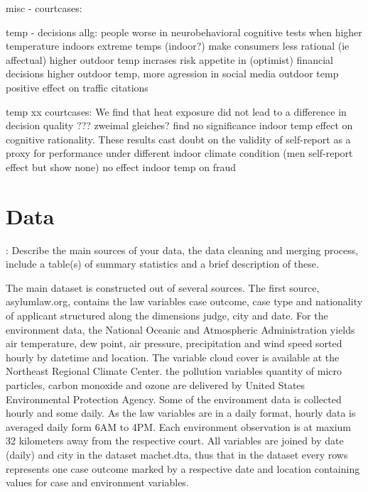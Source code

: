 \documentclass[11pt]{article}
\begin{document}
	misc - courtcases:
	
	temp - decisions allg: 
	\cite{Chen.2020} people worse in neurobehavioral cognitive tests when higher temperature indoors
	\cite{Hadi.2019} extreme temps (indoor?) make consumers less rational (ie affectual) 
	\cite{Gavresi.2021} higher outdoor temp incrases risk appetite in (optimist) financial decisions 
	\cite{Stevens.2021} higher outdoor temp, more agression in social media 
	\cite{Ryan.2020} outdoor temp positive effect on traffic citations
	
	temp xx courtcases:
	\cite{Stroom.2021} We find that heat exposure did not lead to  a difference in decision quality ??? zweimal gleiches?
	\cite{Stroom.2021} find no significance indoor temp effect on cognitive rationality.  These results cast doubt on the validity of self-report as a proxy for performance under different indoor climate condition (men self-report effect but show none) 
	\cite{Liu.2020} no effect indoor temp on fraud 
	
	
	
	
	
	
	\section{Data}
	: Describe the main sources of your data, the data cleaning and merging process,
	include a table(s) of summary statistics and a brief description of these. \newline
	
	The main dataset is constructed out of several sources. The first source, asylumlaw.org, contains the law variables case outcome, case type and nationality of applicant structured along the dimensions judge, city and date. For the environment data, the National Oceanic and Atmospheric Administration yields air temperature, dew point, air pressure, precipitation and wind speed sorted hourly by datetime and location. The variable cloud cover is available at the Northeast Regional Climate Center. the pollution variables quantity of micro particles, carbon monoxide and ozone are delivered by United States Environmental Protection Agency. Some of the environment data is collected hourly and some daily. As the law variables are in a daily format, hourly data is averaged daily form 6AM to 4PM. Each environment observation is at maxium 32 kilometers away from the respective court.
	All variables are joined by date (daily) and city in the dataset machet.dta, thus that in the dataset every rows represents one case outcome marked by a respective date and location containing values for case and environment variables.
	
\end{document}
